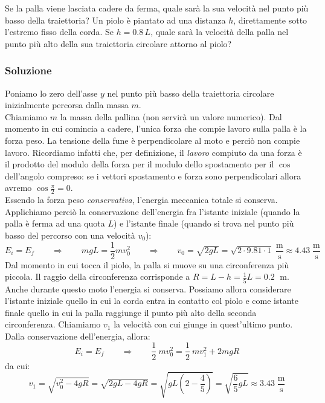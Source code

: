 \documentclass[12pt,a4paper]{book}
\begin{document}
Se la palla viene lasciata cadere da ferma, quale sarà la sua velocità nel punto più basso della traiettoria? Un piolo è piantato ad una distanza $h$, direttamente sotto l'estremo fisso della corda. Se $h=0.8 \, L$, quale sarà la velocità della palla nel punto più alto della sua traiettoria circolare attorno al piolo? 

\subsubsection*{Soluzione}
Poniamo lo zero dell'asse $y$ nel punto più basso della traiettoria circolare inizialmente percorsa dalla massa $m$. \\

Chiamiamo $m$ la massa della pallina (non servirà un valore numerico). Dal momento in cui comincia a cadere, l'unica forza che compie lavoro sulla palla è la forza peso. La tensione della fune è perpendicolare al moto e perciò non compie lavoro. Ricordiamo infatti che, per definizione, il \textit{lavoro} compiuto da una forza è il prodotto del modulo della forza per il modulo dello spostamento per il $\cos$ dell'angolo compreso: se i vettori spostamento e forza sono perpendicolari allora avremo $\cos \frac{\pi}{2}=0$. \\

Essendo la forza peso \textit{conservativa}, l'energia meccanica totale si conserva. Applichiamo perciò la conservazione dell'energia fra l'istante iniziale (quando la palla è ferma ad una quota $L$) e l'istante finale (quando si trova nel punto più basso del percorso con una velocità $v_0$):\\
\begin{equation*}
E_{i}=E_{f} \qquad \Rightarrow  \qquad  mgL = \frac{1}{2}m v_0^2 \qquad \Rightarrow  \qquad v_0=\sqrt{2gL}=\sqrt{2\cdot 9.81 \cdot 1} \; \frac{\text{m}}{\text{s}} \approx 4.43 \; \frac{\text{m}}{\text{s}}
\end{equation*}
Dal momento in cui tocca il piolo, la palla si muove su una circonferenza più piccola. Il raggio della circonferenza corrisponde a $R=L-h = \frac{1}{5} L = 0.2 \;$ m. Anche durante questo moto l'energia si conserva. Possiamo allora considerare l'istante iniziale quello in cui la corda entra in contatto col piolo e come istante finale quello in cui la palla raggiunge il punto più alto della seconda circonferenza. Chiamiamo $v_1$ la velocità con cui giunge in quest'ultimo punto. Dalla conservazione dell'energia, allora:
\begin{equation*}
E_{i}=E_{f} \qquad \Rightarrow  \qquad   \frac{1}{2}\: m v_0^2 = \frac{1}{2}\: m v_1^2 + 2mgR 
\end{equation*}
da cui:
\begin{equation*}
v_1 = \sqrt{v_0^2 - 4gR}=  \sqrt{2gL - 4gR}= \sqrt{gL(2-\frac{4}{5})}=  \sqrt{\frac{6}{5}gL} \approx 3.43 \; \frac{\text{m}}{\text{s}}
\end{equation*}
\end{document}
